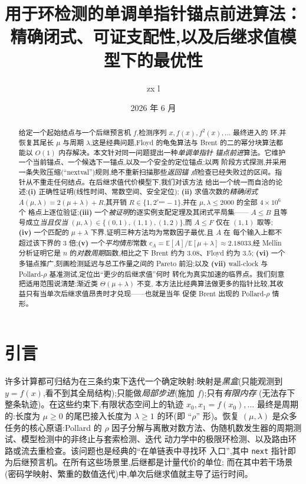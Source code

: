 \documentclass[11pt]{ctexart}
\title{用于环检测的单调单指针锚点前进算法：\\
精确闭式、可证支配性,以及后继求值模型下的最优性}
\author{zx l}
\date{2026 年 6 月}
\newcommand{\nextop}{\texttt{next}}
\begin{document}
\maketitle

\begin{abstract}
给定一个起始结点与一个后继预言机 $f$,检测序列 $x,f(x),f^2(x),\dots$ 最终进入的
环,并恢复其尾长 $\mu$ 与周期 $\lambda$,这是经典问题,Floyd 的龟兔算法与 Brent
的二的幂分块算法都能以 $O(1)$ 内存解决。本文针对同一问题提出一种\emph{单调单指针
锚点前进}算法。它维护一个当前锚点、一个候选下一锚点,以及一个安全的定位锚点;以两
阶段方式探测,并采用一条失败压缩(``nextval'')规则,绝不重新扫描那些\emph{返回锚
点}检查已经失败过的区间。指针从不重走任何结点。在后继求值代价模型下,我们对该方法
给出一个统一而自洽的论述:\textbf{(i)} 正确性证明(线性时间、常数空间、安全定位);
\textbf{(ii)} 求值次数的\emph{精确闭式} $A(\mu,\lambda)=2(\mu+\lambda)+R$,其开销
$R\in\{1,2^{r_{\min}}-1\}$,并在 $\mu,\lambda\le 2000$ 的全部 $4{\times}10^{6}$ 个
格点上逐位验证;\textbf{(iii)} 一个\emph{被证明}的逐实例支配定理及其闭式平局集——
$A\le B$ 且等号成立\emph{当且仅当}
$(\mu,\lambda)\in\{(0,1),(1,1),(1,2)\}$,而 $A\le F$ 仅在 $(1,1)$ 取等;
\textbf{(iv)} 一个匹配的 $\mu+\lambda$ 下界,证明三种方法均为常数因子最优,且 $A$ 在
每个输入上都不超过该下界的 $3$ 倍;\textbf{(v)} 一个\emph{平均情形}常数
$c_A=\mathbb E[A]/\mathbb E[\mu+\lambda]\approx 2.18033$,经 Mellin 分析证明它是 $n$
的\emph{对数周期}函数,相比之下 Brent 约为 $3.08$、Floyd 约为 $3.5$;
\textbf{(vi)} 一个多锚点推广,刻画检测延迟与总工作量之间的 Pareto 前沿;以及
\textbf{(vii)} wall-clock 与 Pollard-$\rho$ 基准测试,定位出``更少的后继求值''何时
转化为真实加速的临界点。我们刻意把适用范围说清楚:渐近类 $\Theta(\mu+\lambda)$ 不变,
本方法比经典算法做更多的指针比较,其收益只有当单次后继求值昂贵时才兑现——也就是当年
促使 Brent 出现的 Pollard-$\rho$ 情形。
\end{abstract}

\section{引言}
\label{sec:intro}

许多计算都可归结为在三条约束下迭代一个确定映射:映射是\emph{黑盒}(只能观测到
$y=f(x)$,看不到其全局结构);只能做\emph{局部步进}(施加 $f$);只有\emph{有限内存}
(无法存下整条轨迹)。在这些约束下,有限状态空间上的轨迹
$x_0,x_1=f(x_0),\dots$ 最终是周期的:长度为 $\mu\ge 0$ 的尾巴接入长度为 $\lambda\ge 1$
的环(即 ``$\rho$'' 形)。恢复 $(\mu,\lambda)$ 是众多任务的核心原语:Pollard 的 $\rho$
因子分解与离散对数方法、伪随机数发生器的周期测试、模型检测中的非终止与套索检测、迭代
动力学中的极限环检测、以及路由环路或流去重检查。该问题也是经典的``在单链表中寻找环
入口'',其中 \nextop{} 指针即为后继预言机。在所有这些场景里,后继都是计量代价的单位;
而在其中若干场景(密码学映射、繁重的数值迭代)中,单次后继求值就主导了运行时间。
\end{document}
